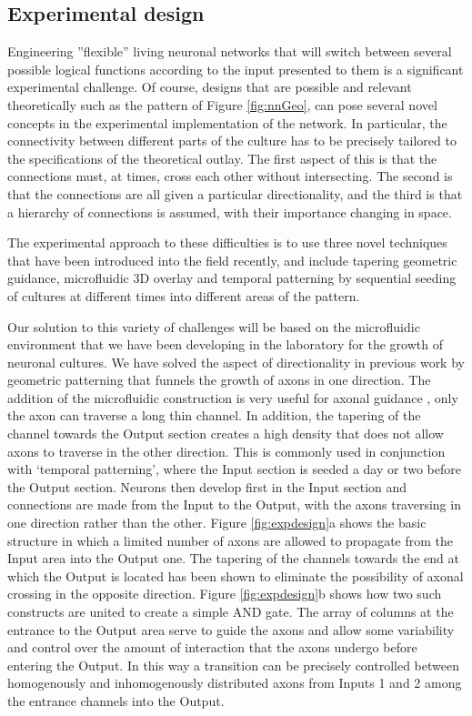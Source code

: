\subsection{Experimental design}
Engineering ''flexible'' living neuronal networks that will switch between several possible logical functions according to the input presented to them is a significant experimental challenge. Of course, designs that are possible and relevant theoretically such as the pattern of Figure \ref{fig:nnGeo}, can pose several novel concepts in the experimental implementation of the network. In particular, the connectivity between different parts of the culture has to be precisely tailored to the specifications of the theoretical outlay. The first aspect of this is that the connections must, at times, cross each other without intersecting. The second is that the connections are all given a particular directionality, and the third is that a hierarchy of connections is assumed, with their importance changing in space.

The experimental approach to these difficulties is to use three novel techniques that have been introduced into the field recently, and include tapering geometric guidance, microfluidic 3D overlay and temporal patterning by sequential seeding of cultures at different times into different areas of the pattern.

Our solution to this variety of challenges will be based on the microfluidic environment that we have been developing in the laboratory for the growth of neuronal cultures. We have solved the aspect of directionality in previous work \cite{Feinerman2008} by geometric patterning that funnels the growth of axons in one direction. The addition of the microfluidic construction is very useful for axonal guidance \cite{Peyrin2011,Park2006,Taylor2005}, only the axon can traverse a long thin channel. In addition, the tapering of the channel towards the Output section creates a high density that does not allow axons to traverse in the other direction. This is commonly used in conjunction with ‘temporal patterning’, where the Input section is seeded a day or two before the Output section. Neurons then develop first in the Input section and connections are made from the Input to the Output, with the axons traversing in one direction rather than the other.
Figure \ref{fig:expdesign}a shows the basic structure in which a limited number of axons are allowed to propagate from the Input area into the Output one. The tapering of the channels towards the end at which the Output is located has been shown \cite{Peyrin2011} to eliminate the possibility of axonal crossing in the opposite direction. Figure \ref{fig:expdesign}b shows how two such constructs are united to create a simple AND gate. The array of columns at the entrance to the Output area serve to guide the axons and allow some variability and control over the amount of interaction that the axons undergo before entering the Output. In this way a transition can be precisely controlled between homogenously and inhomogenously distributed axons from Inputs 1 and 2 among the entrance channels into the Output.

